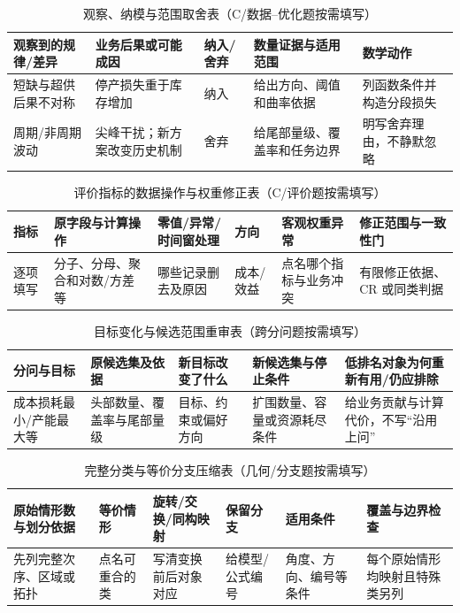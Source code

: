 \documentclass[withoutpreface,bwprint]{cumcmthesis}
\begin{document}
  \begin{table}[H]
    \centering
    \small
    \caption{观察、纳模与范围取舍表（C/数据--优化题按需填写）}
    \label{tab:observation-modeling-scope-guide}
    \begin{tabular}{p{2.15cm}p{2.5cm}p{1.35cm}p{2.8cm}p{3.25cm}}
      \toprule
      观察到的规律/差异 & 业务后果或可能成因 & 纳入/舍弃 & 数量证据与适用范围 & 数学动作 \\
      \midrule
      短缺与超供后果不对称 & 停产损失重于库存增加 & 纳入 & 给出方向、阈值和曲率依据 & 列函数条件并构造分段损失 \\
      周期/非周期波动 & 尖峰干扰；新方案改变历史机制 & 舍弃 & 给尾部量级、覆盖率和任务边界 & 明写舍弃理由，不静默忽略 \\
      \bottomrule
    \end{tabular}
  \end{table}
  \begin{table}[H]
    \centering
    \small
    \caption{评价指标的数据操作与权重修正表（C/评价题按需填写）}
    \label{tab:indicator-operation-weight-guide}
    \begin{tabular}{p{1.65cm}p{2.55cm}p{2.25cm}p{1.35cm}p{2.45cm}p{2.55cm}}
      \toprule
      指标 & 原字段与计算操作 & 零值/异常/时间窗处理 & 方向 & 客观权重异常 & 修正范围与一致性门 \\
      \midrule
      逐项填写 & 分子、分母、聚合和对数/方差等 & 哪些记录删去及原因 & 成本/效益 & 点名哪个指标与业务冲突 & 有限修正依据、CR 或同类判据 \\
      \bottomrule
    \end{tabular}
  \end{table}
  \begin{table}[H]
    \centering
    \small
    \caption{目标变化与候选范围重审表（跨分问题按需填写）}
    \label{tab:objective-reversal-scope-guide}
    \begin{tabular}{p{2.0cm}p{2.25cm}p{2.35cm}p{2.35cm}p{3.65cm}}
      \toprule
      分问与目标 & 原候选集及依据 & 新目标改变了什么 & 新候选集与停止条件 & 低排名对象为何重新有用/仍应排除 \\
      \midrule
      成本损耗最小/产能最大等 & 头部数量、覆盖率与尾部量级 & 目标、约束或偏好方向 & 扩围数量、容量或资源耗尽条件 & 给业务贡献与计算代价，不写“沿用上问” \\
      \bottomrule
    \end{tabular}
  \end{table}
  \begin{table}[H]
    \centering
    \small
    \caption{完整分类与等价分支压缩表（几何/分支题按需填写）}
    \label{tab:case-symmetry-reduction-guide}
    \begin{tabular}{p{2.0cm}p{2.2cm}p{2.55cm}p{2.0cm}p{2.1cm}p{2.15cm}}
      \toprule
      原始情形数与划分依据 & 等价情形 & 旋转/交换/同构映射 & 保留分支 & 适用条件 & 覆盖与边界检查 \\
      \midrule
      先列完整次序、区域或拓扑 & 点名可重合的类 & 写清变换前后对象对应 & 给模型/公式编号 & 角度、方向、编号等条件 & 每个原始情形均映射且特殊类另列 \\
      \bottomrule
    \end{tabular}
  \end{table}
\end{document}
